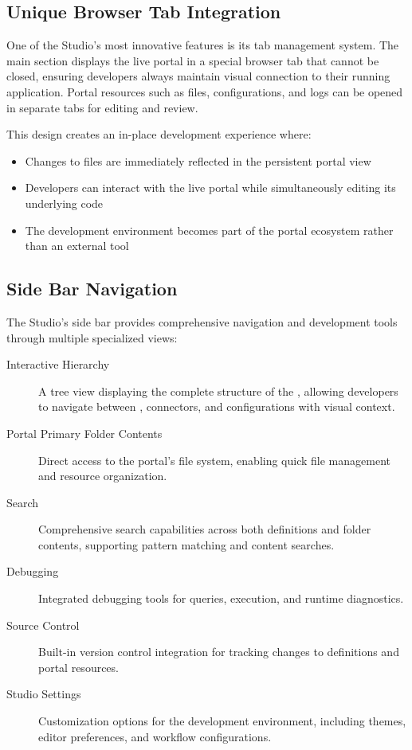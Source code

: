 \subsection{Unique Browser Tab Integration}
\label{sec:studio-browser-tab}

One of the Studio's most innovative features is its tab management system. The main section displays the live portal in a special browser tab that cannot be closed, ensuring developers always maintain visual connection to their running application. Portal resources such as files, configurations, and logs can be opened in separate tabs for editing and review.

This design creates an in-place development experience where:
\begin{itemize}
    \item Changes to \wbol{} files are immediately reflected in the persistent portal view
    \item Developers can interact with the live portal while simultaneously editing its underlying code
    \item The development environment becomes part of the portal ecosystem rather than an external tool
\end{itemize}

\subsection{Side Bar Navigation}
\label{sec:studio-sidebar}

The Studio's side bar provides comprehensive navigation and development tools through multiple specialized views:

\begin{description}
    \item[Interactive \webbase{} Hierarchy] A tree view displaying the complete structure of the \webbase{}, allowing developers to navigate between \webbaselets{}, connectors, and configurations with visual context.
    \item[Portal Primary Folder Contents] Direct access to the portal's file system, enabling quick file management and resource organization.
    \item[Search] Comprehensive search capabilities across both \webbase{} definitions and folder contents, supporting pattern matching and content searches.
    \item[Debugging] Integrated debugging tools for \wbpl{} queries, \webbaselet{} execution, and runtime diagnostics.
    \item[Source Control] Built-in version control integration for tracking changes to \webbase{} definitions and portal resources.
    \item[Studio Settings] Customization options for the development environment, including themes, editor preferences, and workflow configurations.
\end{description}


